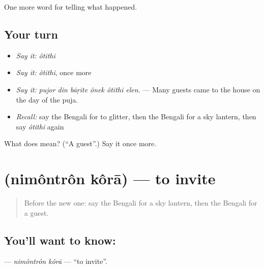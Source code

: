 \begin{grammarlens}[title={What you've built}]
One more word for telling what happened.
\end{grammarlens}

\subsection*{Your turn}
\begin{itemize}
\raggedright
  \item \emph{Say it:} \emph{ôtithi}
  \item \emph{Say it:} \emph{ôtithi}, once more
  \item \emph{Say it:} \emph{pujor din bāṛite ônek ôtithi elen.} — Many guests came to the house on the day of the puja.
  \item \emph{Recall:} say the Bengali for to glitter, then the Bengali for a sky lantern, then say \emph{ôtithi} again
\end{itemize}

\begin{tcolorbox}[breakable,colback=teal!4,colframe=teal!35!black,title={Before you move on}]
What does  mean? (\textquotedblleft{}A guest\textquotedblright{}.) Say it once more.
\end{tcolorbox}
\section[\texorpdfstring{\bn{নিমন্ত্রণ} \bn{করা} (nimôntrôn kôrā)}{নিমন্ত্রণ করা (nimôntrôn kôrā)}]{  (nimôntrôn kôrā) — to invite}

\label{lesson:BN-C306-nimontron-kora}



\begin{quote}
Before the new one: say the Bengali for a sky lantern, then the Bengali for a guest.
\end{quote}

\subsection*{You'll want to know:  }
\textbf{ } — \emph{nimôntrôn kôrā} — \textquotedblleft{}to invite\textquotedblright{}.

\begin{quote}
      
\end{quote}

